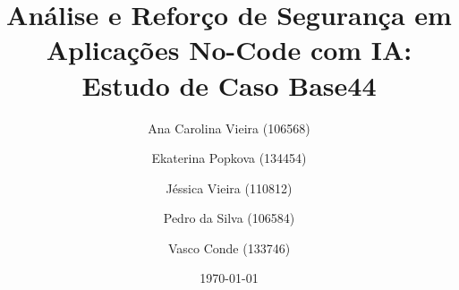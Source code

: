\documentclass[a4paper, 12pt]{article}
\title{Análise e Reforço de Segurança em Aplicações No-Code com IA: Estudo de Caso Base44}
\author{
Ana Carolina Vieira (106568) \and
Ekaterina Popkova (134454) \and
Jéssica Vieira (110812) \and
Pedro da Silva (106584) \and
Vasco Conde (133746)
}
\date{\today}
\begin{document}






\renewcommand{\contentsname}{Índice}
\tableofcontents


\listoffigures















{}


\end{document}
